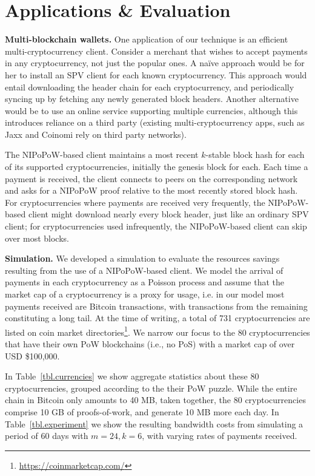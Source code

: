 \section{Applications \& Evaluation}
\label{sec.applications}

\textbf{Multi-blockchain wallets.}
\label{sec.multichain}
One application of our technique is an efficient multi-cryptocurrency client.
Consider a merchant that wishes to accept payments in any cryptocurrency, not
just the popular ones. A na\"ive approach would be for her to  install an SPV
client for each known cryptocurrency. This approach would entail downloading the
header chain for each cryptocurrency, and periodically syncing up by fetching
any newly generated block headers. Another alternative would be to use an online
service supporting multiple currencies, although this introduces reliance on a
third party (existing multi-cryptocurrency apps, such as Jaxx and Coinomi rely
on third party networks).

The NIPoPoW-based client maintains a most recent $k$-stable block hash for each
of its supported cryptocurrencies, initially the genesis block for each. Each
time a payment is received, the client connects to peers on the corresponding
network and asks for a NIPoPoW proof relative to the most recently stored block
hash. For cryptocurrencies where payments are received very frequently, the
NIPoPoW-based client might download nearly every block header, just like an
ordinary SPV client; for cryptocurrencies used infrequently, the
NIPoPoW-based client can skip over most blocks.

\textbf{Simulation.}
We developed a simulation to evaluate the resources savings resulting from the
use of a NIPoPoW-based client. We model the arrival of payments in each
cryptocurrency as a Poisson process and assume that the market cap of a
cryptocurrency is a proxy for usage, i.e. in our model most payments received
are Bitcoin transactions, with transactions from the remaining constituting a
long tail. At the time of writing, a total of 731 cryptocurrencies are listed on
coin market directories\footnote{\url{https://coinmarketcap.com/}}. We narrow
our focus to the 80 cryptocurrencies that have their own PoW blockchains (i.e.,
no PoS) with a market cap of over USD \$100,000.

In Table~\ref{tbl.currencies} we show aggregate statistics about these 80
cryptocurrencies, grouped according to the their PoW puzzle. While the entire
chain in Bitcoin only amounts to 40 MB, taken together, the 80 cryptocurrencies
comprise 10 GB of proofs-of-work, and generate 10 MB more each day. In
Table~\ref{tbl.experiment} we show the resulting bandwidth costs from simulating
a period of 60 days with $m=24, k=6$, with varying rates of payments received.

